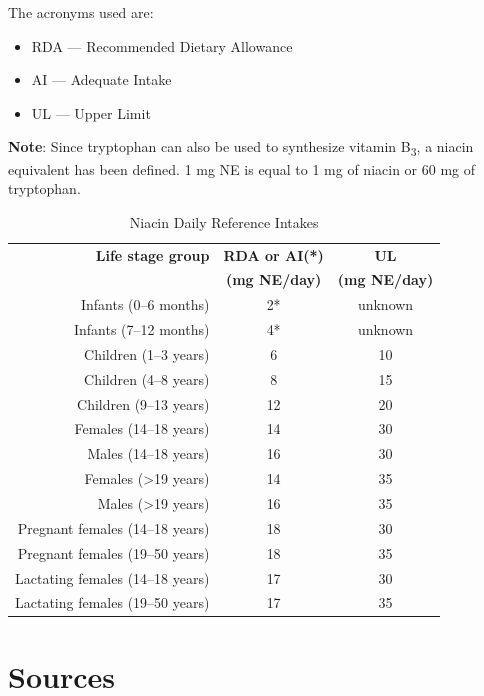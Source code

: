 \documentclass{book}
\begin{document}
\begin{sloppypar}
The acronyms used are:
\begin{itemize}
	\item RDA --- Recommended Dietary Allowance
	\item AI --- Adequate Intake
	\item UL --- Upper Limit
\end{itemize}

\textbf{Note}: Since tryptophan can also be used to synthesize vitamin B\textsubscript{3}, a niacin equivalent has been defined. 1 mg NE is equal to 1 mg of niacin or 60 mg of tryptophan.

\begin{table}[ht]
	\caption{Niacin Daily Reference Intakes}
	\centering \begin{tabular}{| r | c | c |}
		\hline
		\textbf{Life stage group} & \textbf{RDA or AI(*)} & \textbf{UL}\\
		& \textbf{(mg NE/day)} & \textbf{(mg NE/day)}\\ \hline
		Infants (0--6 months) & 2* & unknown\\ \hline
		Infants (7--12 months) & 4* & unknown\\ \hline
		Children (1--3 years) & 6 & 10\\ \hline
		Children (4--8 years) & 8 & 15\\ \hline
		Children (9--13 years) & 12 & 20\\ \hline
		Females (14--18 years) & 14 & 30\\ \hline
		Males (14--18 years) & 16 & 30\\ \hline
		Females (\textgreater19 years) & 14 & 35\\ \hline
		Males (\textgreater19 years) & 16 & 35\\ \hline
		Pregnant females (14--18 years) & 18 & 30\\ \hline
		Pregnant females (19--50 years) & 18 & 35\\ \hline
		Lactating females (14--18 years) & 17 & 30\\ \hline
		Lactating females (19--50 years) & 17 & 35\\ \hline
	\end{tabular}
\end{table}
\newpage

\section{Sources}



\end{sloppypar}
\end{document}
